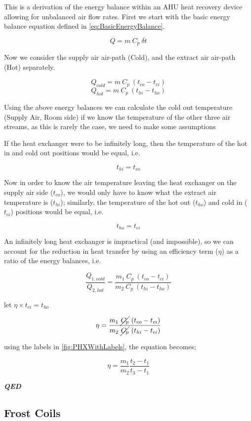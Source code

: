 \begin{derivation}
\label{der:PHXEfficiency}
\onehalfspacing

This is a derivation of the energy balance within an AHU heat recovery device allowing for unbalanced air flow rates.  First we start with the basic energy balance equation defined in \autoref{eq:BasicEnergyBalance}.

\[Q = m~C_p~\delta t\]

Now we consider the supply air air-path (Cold), and the extract air air-path (Hot) separately.

\[Q_{cold} = m~C_p~(t_{co} - t_{ci})\]
\[Q_{hot} = m~C_p~(t_{hi} - t_{ho})\]

Using the above energy balances we can calculate the cold out temperature (Supply Air, Room side) if we know the temperature of the other three air streams, as this is rarely the case, we need to make some assumptions

If the heat exchanger were to be infinitely long, then the temperature of the hot in and cold out positions would be equal, i.e.

\[t_{hi} = t_{co}\]

Now in order to know the air temperature leaving the heat exchanger on the supply air side ($t_{co}$), we would only have to know what the extract air temperature is ($t_{hi}$); similarly, the temperature of the hot out ($t_{ho}$) and cold in ($t_{ci}$) positions would be equal, i.e.

\[t_{ho} = t_{ci}\]

An infinitely long heat exchanger is impractical (and impossible), so we can account for the reduction in heat transfer by using an efficiency term ($\eta$) as a ratio of the energy balances, i.e.

\[\frac{Q_{1,cold}}{Q_{2,hot}} = \frac{m_1~C_p~(t_{co} - t_{ci})}{m_2~C_p~(t_{hi} - t_{ho})}\]

let $\eta \times t_{ci} = t_{ho}$

\[\eta = \frac{m_1~\cancel{C_p}~(t_{co} - t_{ci})}{m_2~\cancel{C_p}~(t_{hi} - t_{ci})}\]

using the labels in \autoref{fig:PHXWithLabels}, the equation becomes;

\[\eta = \frac{m_1}{m_2} \frac{t_2 - t_1}{t_3 - t_1}\]

\textbf{\textit{QED}}

\end{derivation}

\subsection{Frost Coils}
\label{ssec:FrostCoils}

